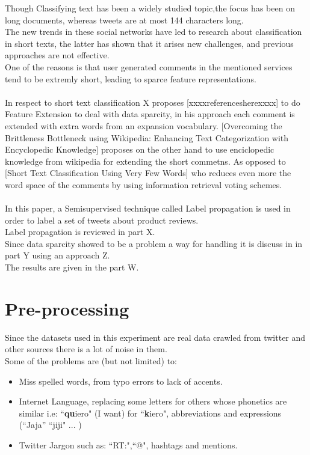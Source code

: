 \documentclass[4pt,a4paper,twocolumn]{article}
\begin{document}
Though Classifying text has been a widely studied topic,the focus has been on long documents,
whereas tweets are at most 144 characters long.\\
The new trends in these social networks have led to research about classification in short texts, the latter has  shown that it arises new challenges, and previous approaches are not  effective.\\
One of the reasons is that  user generated comments in the mentioned services tend to be extremly short, leading to sparce feature representations.\\
\\
In respect to short text classification X proposes [xxxxreferencesherexxxx] to do Feature Extension to deal with data sparcity, in his approach each comment is extended with extra words from an expansion vocabulary.
[Overcoming the Brittleness Bottleneck using Wikipedia:
Enhancing Text Categorization with Encyclopedic Knowledge] proposes on the other hand to use enciclopedic knowledge from wikipedia for extending the short commetns.
As opposed to [Short Text Classification Using Very Few Words] who reduces even more the word space of the comments by using information retrieval voting schemes.\\
\\
In this paper, a Semisupervised technique called Label propagation is used
in order to label a set of tweets about product reviews.\\
Label propagation is reviewed in part X.\\
Since data sparcity showed to be a problem a way for handling it
is discuss in in part Y using an approach Z.\\
The results are given in the part W.

\part*{Pre-processing}

Since the datasets used in this experiment are real data crawled from twitter and other sources there is a lot of noise in them.\\
Some of the problems are (but not limited) to:\\
\begin{itemize}
	\item Miss spelled words, from typo errors to lack of accents.
	\item Internet Language, replacing some letters for others whose phonetics are similar i.e: ``\textbf{qu}iero" (I want) for ``\textbf{k}iero", abbreviations and expressions (``Jaja'' ``jiji" ... )
	\item Twitter Jargon such as: ``RT:",``@", hashtags and mentions. 
\end{itemize} 
\end{document}
